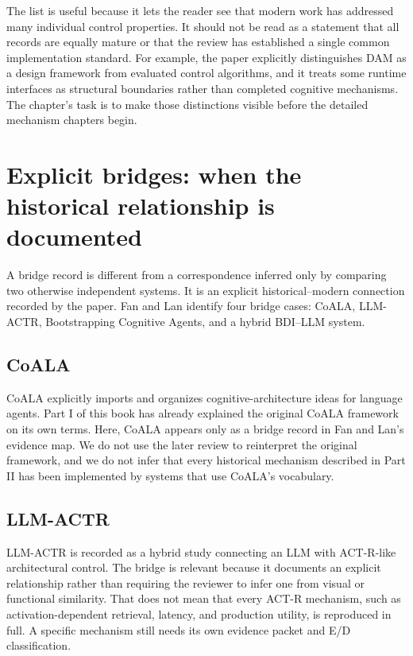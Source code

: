 The list is useful because it lets the reader see that modern work has addressed many individual control properties. It should not be read as a statement that all records are equally mature or that the review has established a single common implementation standard. For example, the paper explicitly distinguishes DAM as a design framework from evaluated control algorithms, and it treats some runtime interfaces as structural boundaries rather than completed cognitive mechanisms. The chapter's task is to make those distinctions visible before the detailed mechanism chapters begin.

\section{Explicit bridges: when the historical relationship is documented}
\label{sec:ch11-explicit-bridges}

A bridge record is different from a correspondence inferred only by comparing two otherwise independent systems. It is an explicit historical--modern connection recorded by the paper. Fan and Lan identify four bridge cases: CoALA, LLM-ACTR, Bootstrapping Cognitive Agents, and a hybrid BDI--LLM system.

\subsection{CoALA}

CoALA explicitly imports and organizes cognitive-architecture ideas for language agents. Part I of this book has already explained the original CoALA framework on its own terms. Here, CoALA appears only as a bridge record in Fan and Lan's evidence map. We do not use the later review to reinterpret the original framework, and we do not infer that every historical mechanism described in Part II has been implemented by systems that use CoALA's vocabulary.

\subsection{LLM-ACTR}

LLM-ACTR is recorded as a hybrid study connecting an LLM with ACT-R-like architectural control. The bridge is relevant because it documents an explicit relationship rather than requiring the reviewer to infer one from visual or functional similarity. That does not mean that every ACT-R mechanism, such as activation-dependent retrieval, latency, and production utility, is reproduced in full. A specific mechanism still needs its own evidence packet and E/D classification.

